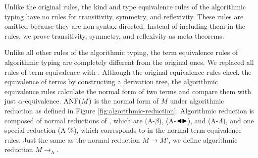 \begin{center}
    {\small
     \hfil
    }
\end{center}


Unlike the original rules, the kind and type equivalence rules of the
algorithmic typing have no rules for transitivity, symmetry, and reflexivity.
These rules are omitted because they are non-syntax directed. Instead of
including them in the rules, we prove transitivity, symmetry, and reflexivity
as meta theorems.


Unlike all other rules of the algorithmic typing, the term equivalence rules of algorithmic typing are completely different from the original ones. We replaced all rules of term equivalence with \QAANF. Although the original equivalence rules check the equivalence of terms by constructing a derivation tree, the algorithmic equivalence rules calculate the normal form of two terms and compare them with just \( \alpha \)-equivalence. \( \text{ANF}(M) \) is the normal form of \( M \) under algorithmic reduction as defined in Figure \ref{fig:algorithmic-reduction}. Algorithmic reduction is composed of normal reductions of \LMD, which are \textsc{(A-$\beta$)}, \textsc{(A-${\mathop{\blacktriangleleft}}{\mathop{\blacktriangleright}}$)}, and \textsc{(A-$\Lambda$)}, and one special reduction \textsc{(A-$\%$)}, which corresponds to \QPercent in the normal term equivalence rules. Just the same as the normal reduction \( M \longrightarrow M' \), we define algorithmic reduction \( M \longrightarrow_{\text{A}} \).  

\begin{center}
\end{center}


